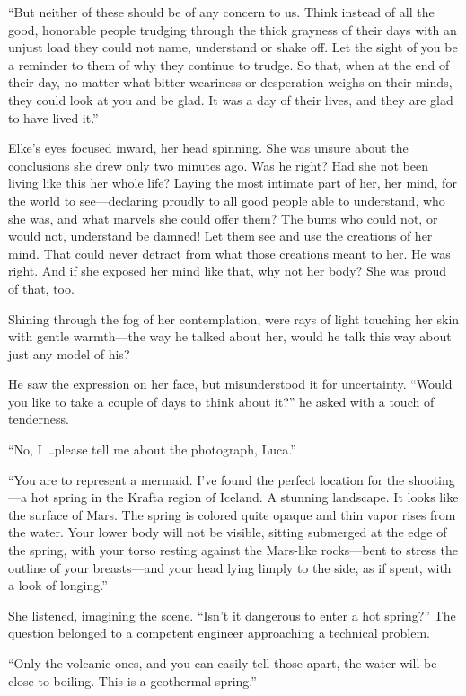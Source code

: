 ``But neither of these should be of any concern to us. Think instead of all the good, honorable people trudging through the thick grayness of their days with an unjust load they could not name, understand or shake off. Let the sight of you be a reminder to them of why they continue to trudge. So that, when at the end of their day, no matter what bitter weariness or desperation weighs on their minds, they could look at you and be glad. It was a day of their lives, and they are glad to have lived it.''

Elke's eyes focused inward, her head spinning. She was unsure about the conclusions she drew only two minutes ago. Was he right? Had she not been living like this her whole life? Laying the most intimate part of her, her mind, for the world to see---declaring proudly to all good people able to understand, who she was, and what marvels she could offer them? The bums who could not, or would not, understand be damned! Let them see and use the creations of her mind. That could never detract from what those creations meant to her. He was right. And if she exposed her mind like that, why not her body? She was proud of that, too.

Shining through the fog of her contemplation, were rays of light touching her skin with gentle warmth---the way he talked about her, would he talk this way about just any model of his?

He saw the expression on her face, but misunderstood it for uncertainty. ``Would you like to take a couple of days to think about it?'' he asked with a touch of tenderness.

``No, I \ldots please tell me about the photograph, Luca.''

``You are to represent a mermaid. I've found the perfect location for the shooting---a hot spring in the Krafta region of Iceland. A stunning landscape. It looks like the surface of Mars. The spring is colored quite opaque and thin vapor rises from the water. Your lower body will not be visible, sitting submerged at the edge of the spring, with your torso resting against the Mars-like rocks---bent to stress the outline of your breasts---and your head lying limply to the side, as if spent, with a look of longing.''

She listened, imagining the scene. ``Isn't it dangerous to enter a hot spring?'' The question belonged to a competent engineer approaching a technical problem.

``Only the volcanic ones, and you can easily tell those apart, the water will be close to boiling. This is a geothermal spring.''

